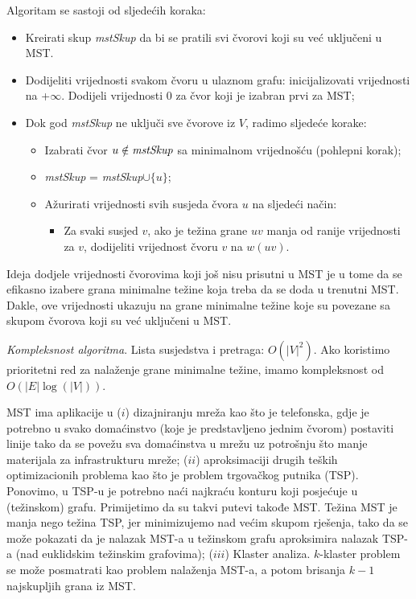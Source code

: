 \documentclass[a4paper, utf8, 11pt, colorlinks]{book}
\begin{document}
Algoritam se sastoji od sljedećih koraka:

\begin{itemize}
	\item Kreirati skup \emph{mstSkup} da bi se pratili svi čvorovi koji su već uključeni u MST.
	\item Dodijeliti vrijednosti svakom čvoru u ulaznom grafu: inicijalizovati vrijednosti na +$\infty$. 
	      Dodijeli vrijednosti 0 za čvor koji je izabran prvi za MST;
	\item Dok god \emph{mstSkup} ne uključi sve čvorove iz $V$, radimo sljedeće korake:
	\begin{itemize}
		\item Izabrati čvor $u\notin\emph{mstSkup} $ sa minimalnom vrijednošću (pohlepni korak);
		\item \emph{mstSkup} = \emph{mstSkup}$\cup \{u\}$;
		\item Ažurirati vrijednosti svih susjeda čvora $u$ na sljedeći način:
		     \begin{itemize}
		     	\item Za svaki susjed $v$, ako je težina grane $uv$ manja od
		             ranije vrijednosti za $v$, dodijeliti vrijednost čvoru $v$ na $w(uv)$. 		    
	         \end{itemize}
	\end{itemize}
\end{itemize}

Ideja dodjele vrijednosti čvorovima koji još nisu prisutni u MST je u tome da se efikasno izabere grana minimalne težine koja treba da se doda u trenutni MST. Dakle, ove vrijednosti ukazuju na grane minimalne težine koje su povezane sa skupom čvorova koji su već uključeni u MST.

\emph{Kompleksnost algoritma}. Lista susjedstva i pretraga: $O(|V|^2)$. Ako  koristimo prioritetni red za nalaženje grane minimalne težine, imamo kompleksnost od $O( |E| \log(|V|))$. 

MST ima aplikacije u ($i$) dizajniranju mreža kao što je telefonska, gdje je potrebno u svako domaćinstvo (koje je predstavljeno jednim čvorom) postaviti linije tako da se povežu sva domaćinstva u mrežu uz potrošnju što manje materijala za infrastrukturu mreže; ($ii$) aproksimaciji drugih teških optimizacionih problema kao što je problem trgovačkog putnika (TSP). Ponovimo, u TSP-u je potrebno naći najkraću konturu koji posjećuje u (težinskom) grafu. Primijetimo da su takvi putevi takođe MST. Težina MST je manja nego težina TSP, jer minimizujemo nad većim skupom rješenja, tako da se može pokazati da je nalazak MST-a u težinskom grafu aproksimira nalazak TSP-a (nad euklidskim težinskim grafovima); ($iii$) Klaster analiza. $k$-klaster problem  se može posmatrati kao problem nalaženja MST-a, a potom brisanja $k-1$ najskupljih grana iz MST. 
\end{document}
